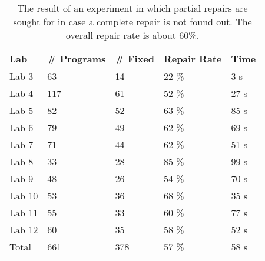 \begin{table}[t!]
\centering
\caption{The result of an experiment in which partial repairs are sought for in case a complete repair is not found out. The overall repair rate is about 60\%.} 
\label{fig:main-result}
\begingroup\normalsize
\begin{tabular}{lllll}
  \toprule 
 Lab & \# Programs & \# Fixed & Repair Rate & Time \\
 \midrule 
 Lab 3 & 63 & 14 & 22 \% & 3 s \\ 
  Lab 4 & 117 & 61 & 52 \% & 27 s \\ 
  Lab 5 & 82 & 52 & 63 \% & 85 s \\ 
  Lab 6 & 79 & 49 & 62 \% & 69 s \\ 
  Lab 7 & 71 & 44 & 62 \% & 51 s \\ 
  Lab 8 & 33 & 28 & 85 \% & 99 s \\ 
  Lab 9 & 48 & 26 & 54 \% & 70 s \\ 
  Lab 10 & 53 & 36 & 68 \% & 35 s \\ 
  Lab 11 & 55 & 33 & 60 \% & 77 s \\ 
  Lab 12 & 60 & 35 & 58 \% & 52 s \\ 
   \bottomrule 
Total & 661 & 378 & 57 \% & 58 s \\ 
   \midrule 
\end{tabular}
\endgroup
\end{table}
